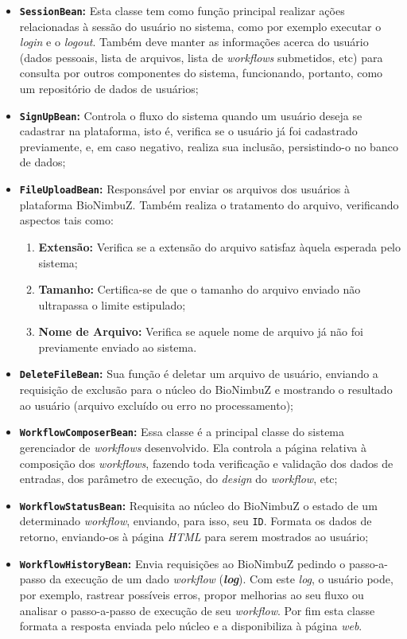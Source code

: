 \begin{itemize}
	\item \textbf{\texttt{SessionBean}:} Esta classe tem como função principal realizar ações relacionadas à sessão do usuário no sistema, como por exemplo executar o \textit{login} e o \textit{logout}. Também deve manter as informações acerca do usuário (dados pessoais, lista de arquivos, lista de \textit{workflows} submetidos, etc) para consulta por outros componentes do sistema, funcionando, portanto, como um repositório de dados de usuários;
	\item \textbf{\texttt{SignUpBean}:} Controla o fluxo do sistema quando um usuário deseja se cadastrar na plataforma, isto é, verifica se o usuário já foi cadastrado previamente, e, em caso negativo, realiza sua inclusão, persistindo-o no banco de dados;
	\item \textbf{\texttt{FileUploadBean}:} Responsável por enviar os arquivos dos usuários à plataforma BioNimbuZ. Também realiza o tratamento do arquivo, verificando aspectos tais como: 
	\begin{enumerate}	
		\item \textbf{Extensão:} Verifica se a extensão do arquivo satisfaz àquela esperada pelo sistema;
		\item \textbf{Tamanho:} Certifica-se de que o tamanho do arquivo enviado não ultrapassa o limite estipulado;
		\item \textbf{Nome de Arquivo:} Verifica se aquele nome de arquivo já não foi previamente enviado ao sistema.
	\end{enumerate}		
	\item \textbf{\texttt{DeleteFileBean}:} Sua função é deletar um arquivo de usuário, enviando a requisição de exclusão para o núcleo do BioNimbuZ e mostrando o resultado ao usuário (arquivo excluído ou erro no processamento);
	\item \textbf{\texttt{WorkflowComposerBean}:} Essa classe é a principal classe do sistema gerenciador de \textit{workflows} desenvolvido. Ela controla a página relativa à composição dos \textit{workflows}, fazendo toda verificação e validação dos dados de entradas, dos parâmetro de execução, do \textit{design} do \textit{workflow}, etc;
	\item \textbf{\texttt{WorkflowStatusBean}:} Requisita ao núcleo do BioNimbuZ o estado de um determinado \textit{workflow}, enviando, para isso, seu \texttt{ID}. Formata os dados de retorno, enviando-os à página \textit{HTML} para serem mostrados ao usuário;
	\item \textbf{\texttt{WorkflowHistoryBean}:} Envia requisições ao BioNimbuZ pedindo o passo-a-passo da execução de um dado \textit{workflow} (\textbf{\textit{log}}). Com este \textit{log}, o usuário pode, por exemplo, rastrear possíveis erros, propor melhorias ao seu fluxo ou analisar o passo-a-passo de execução de seu \textit{workflow}. Por fim esta classe formata a resposta enviada pelo núcleo e a disponibiliza à página \textit{web}.
\end{itemize}

